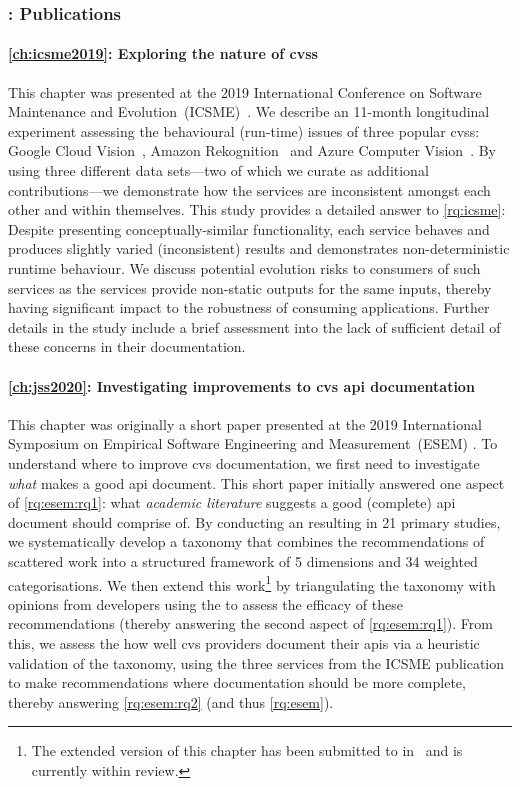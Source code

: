 \subsubsection{: Publications}

\paragraph{\cref{ch:icsme2019}: Exploring the nature of \glspl{cvs}} This chapter was presented at the 2019 International Conference on Software Maintenance and Evolution~(ICSME)~\citep{Cummaudo:2019icsme}. We describe an 11-month longitudinal experiment assessing the behavioural (run-time) issues of three popular \glspl{cvs}: Google Cloud Vision~, Amazon Rekognition~ and Azure Computer Vision~. By using three different data sets---two of which we curate as additional contributions---we demonstrate how the services are inconsistent amongst each other and within themselves. This study provides a detailed answer to \ref{rq:icsme}: Despite presenting conceptually-similar functionality, each service behaves and produces slightly varied (inconsistent) results and demonstrates non-deterministic runtime behaviour. We discuss potential evolution risks to consumers of such services as the services provide non-static outputs for the same inputs, thereby having significant impact to the robustness of consuming applications. Further details in the study include a brief assessment into the lack of sufficient detail of these concerns in their documentation.

\paragraph{\cref{ch:jss2020}: Investigating improvements to \gls{cvs} \gls{api} documentation} This chapter was originally a short paper presented at the 2019 International Symposium on Empirical Software Engineering and Measurement~(ESEM) \citep{Cummaudo:2020icse}. To understand where to improve \gls{cvs} documentation, we first need to investigate \textit{what} makes a good \gls{api} document. This short paper initially answered one aspect of \ref{rq:esem:rq1}: what \textit{academic literature} suggests a good (complete) \gls{api} document should comprise of. By conducting an  resulting in 21 primary studies, we systematically develop a taxonomy that combines the recommendations of scattered work into a structured framework of 5 dimensions and 34 weighted categorisations. We then extend this work\footnote{The extended version of this chapter has been submitted to  in~\citep{Cummaudo:2020jss} and is currently within review.} by triangulating the taxonomy with opinions from developers using the  to assess the efficacy of these recommendations (thereby answering the second aspect of \ref{rq:esem:rq1}). From this, we assess the how well \gls{cvs} providers document their \glspl{api} via a heuristic validation of the taxonomy, using the three services from the ICSME publication to make recommendations where documentation should be more complete, thereby answering \ref{rq:esem:rq2} (and thus \ref{rq:esem}).

